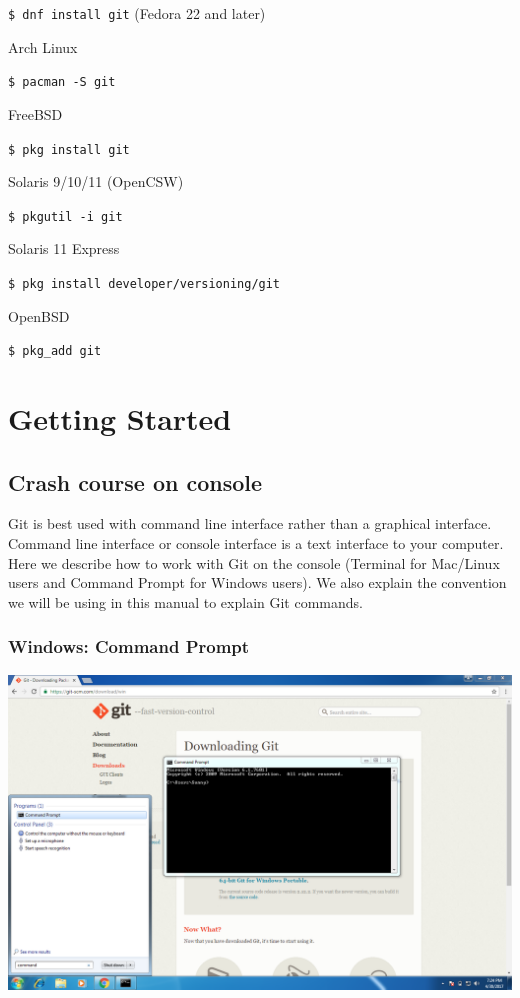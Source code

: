 \documentclass[12pt]{report}
\newcommand\code[1]{{\color{blue}\texttt{#1}}}
\begin{document}
\code{\$ dnf install git} (Fedora 22 and later)

\bigskip

Arch Linux

\code{\$ pacman -S git}

\bigskip

FreeBSD

\code{\$ pkg install git}

\bigskip

Solaris 9/10/11 (OpenCSW)

\code{\$ pkgutil -i git}

\bigskip

Solaris 11 Express

\code{\$ pkg install developer/versioning/git}

\bigskip

OpenBSD

\code{\$ pkg\_add git}


\chapter{Getting Started}

\section{Crash course on console}

Git is best used with command line interface rather than a graphical interface. Command line interface or console interface is a text interface to your computer. Here we describe how to work with Git on the console (Terminal for Mac/Linux users and Command Prompt for Windows users). We also explain the convention we will be using in this manual to explain Git commands.

\subsection{Windows: Command Prompt}

\includegraphics[width=\textwidth]{cmd.png}
\end{document}
